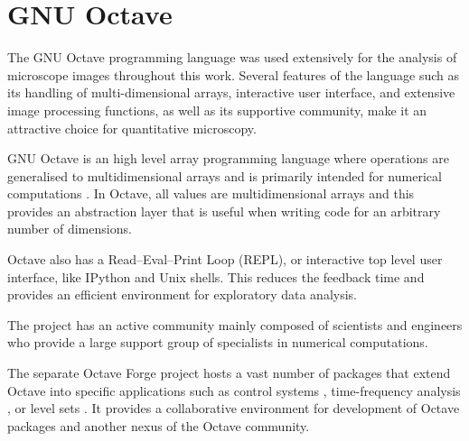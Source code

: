 
\section{GNU Octave}

The GNU Octave programming language was used extensively for the analysis
of microscope images throughout this work.  Several features of the
language such as its handling of multi-dimensional arrays, interactive
user interface, and extensive image processing functions, as well as
its supportive community, make it an attractive choice
for quantitative microscopy.

GNU Octave is an high level array programming
language where operations are generalised to multidimensional arrays
and is primarily intended for numerical computations \citep{octave}.
In Octave, all values are multidimensional arrays and this provides
an abstraction layer that is useful when writing code for an arbitrary
number of dimensions.

Octave also has a Read--Eval--Print Loop (REPL), or interactive top
level user interface, like IPython and Unix shells.  This reduces the
feedback time and provides an efficient
environment for exploratory data analysis.

The project has an active community
mainly composed of
scientists and engineers who provide a large support group of
specialists in numerical computations.

The separate Octave Forge project hosts a vast number of
packages that extend Octave into specific applications such as control
systems \citep{octave-control}, time-frequency analysis
\citep{octave-ltfat}, or level sets \citep{octave-level-set}.
It provides a collaborative environment for development of Octave
packages and another nexus of the Octave community.

